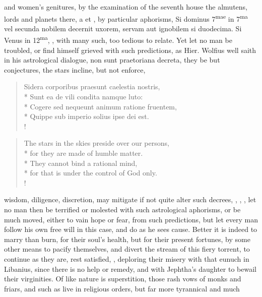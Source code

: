and women's genitures, by the examination of the seventh house the
almutens, lords and planets there, a \leftmoon{} et \astrosun{} \etc{}, by particular
aphorisms, Si dominus 7\textsuperscript{mae} in 7\textsuperscript{ma} vel secunda nobilem decernit uxorem,
servam aut ignobilem si duodecima. Si Venus in 12\textsuperscript{ma}, \etc{}, with many
such, too tedious to relate. Yet let no man be troubled, or find
himself grieved with such predictions, as Hier. Wolfius well saith in
his astrological dialogue, non sunt praetoriana decreta, they be
but conjectures, the stars incline, but not enforce,
%
\begin{latin}%
\begin{verse}%
Sidera corporibus praesunt caelestia nostris,\\*
Sunt ea de vili condita namque luto:\\*
Cogere sed nequeunt animum ratione fruentem,\\*
Quippe sub imperio solius ipse dei est.\\!
\end{verse}%
\end{latin}%
\translationrule%
\begin{verse}%
The stars in the skies preside over our persons,\\*
for they are made of humble matter.\\*
They cannot bind a rational mind,\\*
for that is under the control of God only.\\!
\end{verse}%
%
wisdom, diligence, discretion, may mitigate if not quite alter such
decrees, , , \etc{}, let no man then be terrified or molested
with such astrological aphorisms, or be much moved, either to vain hope
or fear, from such predictions, but let every man follow his own free
will in this case, and do as he sees cause. Better it is indeed to
marry than burn, for their soul's health, but for their present
fortunes, by some other means to pacify themselves, and divert the
stream of this fiery torrent, to continue as they are, rest
satisfied, , deploring their
misery with that eunuch in Libanius, since there is no help or remedy,
and with Jephtha's daughter to bewail their virginities.
Of like nature is superstition, those rash vows of monks and friars,
and such as live in religious orders, but far more tyrannical and much
